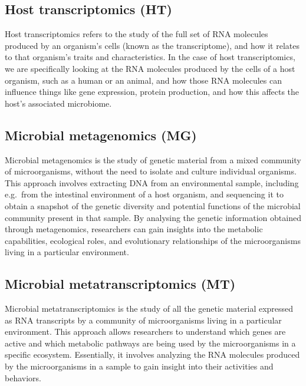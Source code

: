 \documentclass[
]{book}
\begin{document}
\hypertarget{host-transcriptomics}{%
\subsection*{Host transcriptomics (HT)}\label{host-transcriptomics}}

Host transcriptomics refers to the study of the full set of RNA molecules produced by an organism's cells (known as the transcriptome), and how it relates to that organism's traits and characteristics. In the case of host transcriptomics, we are specifically looking at the RNA molecules produced by the cells of a host organism, such as a human or an animal, and how those RNA molecules can influence things like gene expression, protein production, and how this affects the host's associated microbiome.

\hypertarget{microbial-metagenomics}{%
\subsection*{Microbial metagenomics (MG)}\label{microbial-metagenomics}}

Microbial metagenomics is the study of genetic material from a mixed community of microorganisms, without the need to isolate and culture individual organisms. This approach involves extracting DNA from an environmental sample, including e.g.~from the intestinal environment of a host organism, and sequencing it to obtain a snapshot of the genetic diversity and potential functions of the microbial community present in that sample. By analysing the genetic information obtained through metagenomics, researchers can gain insights into the metabolic capabilities, ecological roles, and evolutionary relationships of the microorganisms living in a particular environment.

\hypertarget{microbial-metatranscriptomics}{%
\subsection*{Microbial metatranscriptomics (MT)}\label{microbial-metatranscriptomics}}

Microbial metatranscriptomics is the study of all the genetic material expressed as RNA transcripts by a community of microorganisms living in a particular environment. This approach allows researchers to understand which genes are active and which metabolic pathways are being used by the microorganisms in a specific ecosystem. Essentially, it involves analyzing the RNA molecules produced by the microorganisms in a sample to gain insight into their activities and behaviors.
\end{document}
